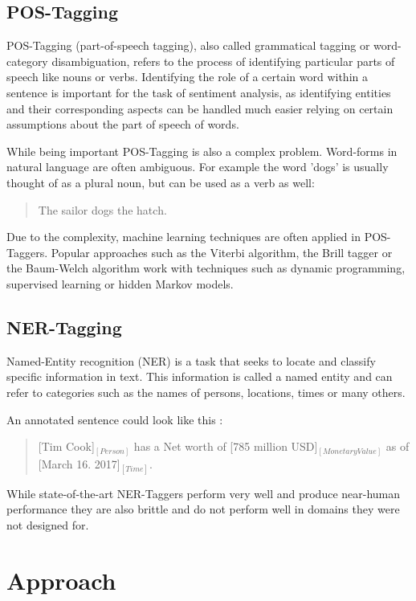 \documentclass[10pt,a4paper]{article}
\begin{document}
		\subsection{POS-Tagging}		
		POS-Tagging (part-of-speech tagging), also called grammatical tagging or word-category disambiguation, refers to the process of identifying particular parts of speech like nouns or verbs. Identifying the role of a certain word within a sentence is important for the task of sentiment analysis, as identifying entities and their corresponding aspects can be handled much easier relying on certain assumptions about the part of speech of words.
		
		While being important POS-Tagging is also a complex problem. Word-forms in natural language are often ambiguous. For example the word 'dogs' is usually thought of as a plural noun, but can be used as a verb as well:

		\begin{quote}
			The sailor dogs the hatch.
		\end{quote}

		Due to the complexity, machine learning techniques are often applied in POS-Taggers. Popular approaches such as the Viterbi algorithm, the Brill tagger or the Baum-Welch algorithm work with techniques such as dynamic programming, supervised learning or hidden Markov models.
		
		\subsection{NER-Tagging}
		
		Named-Entity recognition (NER) is a task that seeks to locate and classify specific information in text. This information is called a named entity and can refer to categories such as the names of persons, locations, times or many others.

		An annotated sentence could look like this :

		\begin{quote}
			[Tim Cook]$_{[Person]}$ has a Net worth of [785 million USD]$_{[Monetary Value]}$ as of [March 16. 2017]$_{[Time]}$.
		\end{quote}
		
		While state-of-the-art NER-Taggers perform very well and produce near-human performance they are also brittle and do not perform well in domains they were not designed for.
	
	\section{Approach}
\end{document}
